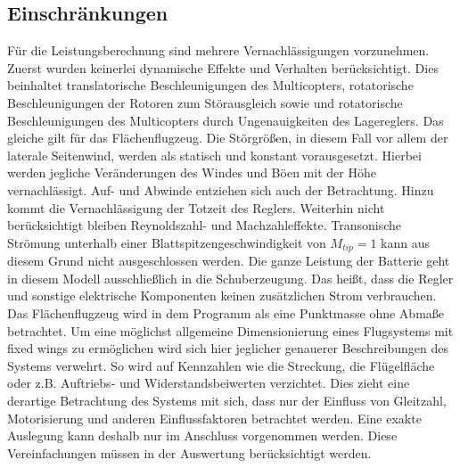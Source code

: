 \subsection{Einschränkungen}
Für die Leistungsberechnung sind mehrere Vernachlässigungen vorzunehmen. Zuerst wurden keinerlei dynamische Effekte und Verhalten berücksichtigt. Dies beinhaltet translatorische Beschleunigungen des Multicopters, rotatorische Beschleunigungen der Rotoren zum Störausgleich sowie und rotatorische Beschleunigungen des Multicopters durch Ungenauigkeiten des Lagereglers. Das gleiche gilt für das Flächenflugzeug. 
Die Störgrößen, in diesem Fall vor allem der laterale Seitenwind, werden als statisch und konstant vorausgesetzt. Hierbei werden jegliche Veränderungen des Windes und Böen mit der Höhe vernachlässigt. Auf- und Abwinde entziehen sich auch der Betrachtung. Hinzu kommt die Vernachlässigung der Totzeit des Reglers. 
Weiterhin nicht berücksichtigt bleiben Reynoldszahl- und Machzahleffekte. Transonische Strömung unterhalb einer Blattspitzengeschwindigkeit von \ensuremath{M_{tip}=1} kann aus diesem Grund nicht ausgeschlossen werden.
Die ganze Leistung der Batterie geht in diesem Modell ausschließlich in die Schuberzeugung. Das heißt, dass die Regler und sonstige elektrische Komponenten keinen zusätzlichen Strom verbrauchen.
Das Flächenflugzeug wird in dem Programm als eine Punktmasse ohne Abmaße betrachtet. Um eine möglichst allgemeine Dimensionierung eines Flugsystems mit fixed wings zu ermöglichen wird sich hier jeglicher genauerer Beschreibungen des Systems verwehrt. So wird auf Kennzahlen wie die Streckung, die Flügelfläche oder z.B. Auftriebs- und Widerstandsbeiwerten verzichtet. Dies zieht eine derartige Betrachtung des Systems mit sich, dass nur der Einfluss von Gleitzahl, Motorisierung und anderen Einflussfaktoren betrachtet werden. Eine exakte Auslegung kann deshalb nur im Anschluss vorgenommen werden. Diese Vereinfachungen müssen in der Auswertung berücksichtigt werden.

